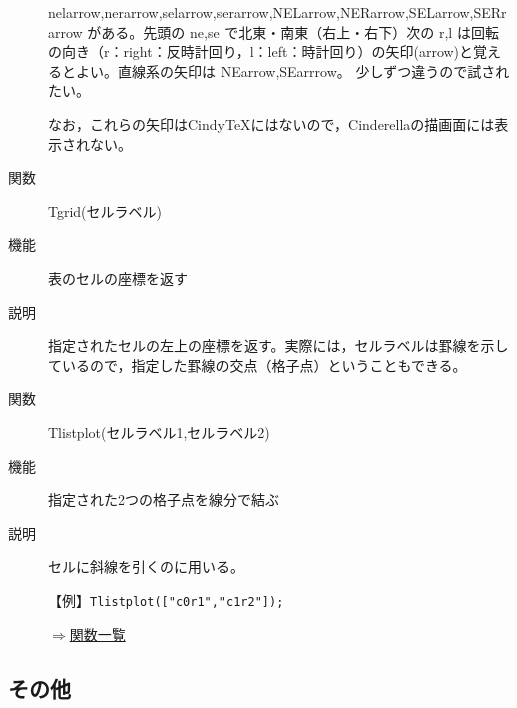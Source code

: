 \documentclass[papersize,a4paper,12pt,uplatex]{jsarticle}
\begin{document}
\begin{description}
nelarrow,nerarrow,selarrow,serarrow,NELarrow,NERarrow,SELarrow,SERrarrow がある。先頭の ne,se で北東・南東（右上・右下）次の r,l は回転の向き（r：right：反時計回り，l：left：時計回り）の矢印(arrow)と覚えるとよい。直線系の矢印は NEarrow,SEarrrow。 少しずつ違うので試されたい。

なお，これらの矢印はCindyTeXにはないので，Cinderellaの描画面には表示されない。


\vspace{\baselineskip}
\hypertarget{tgrid}{}
\item[関数]Tgrid(セルラベル)
\item[機能]表のセルの座標を返す
\item[説明]指定されたセルの左上の座標を返す。実際には，セルラベルは罫線を示しているので，指定した罫線の交点（格子点）ということもできる。

\vspace{\baselineskip}
\hypertarget{tlistplot}{}
\item[関数]Tlistplot(セルラベル1,セルラベル2)
\item[機能]指定された2つの格子点を線分で結ぶ
\item[説明]セルに斜線を引くのに用いる。

\vspace{\baselineskip}
【例】\verb|Tlistplot(["c0r1","c1r2"]);| 

\vspace{\baselineskip}
\begin{flushright}\hyperlink{functionlist}{$\Rightarrow$関数一覧}\end{flushright}

\end{description}

\subsection{その他}
\end{document}
